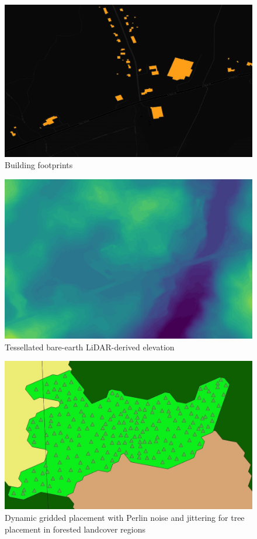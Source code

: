 \documentclass{article}
\begin{document}
\begin{figure}[H]
      \caption{Building footprints}
      \begin{center}
            \includegraphics[width=4.5in]{buildings.jpg}
      \end{center}
\end{figure}

\begin{figure}[H]
      \caption{Tessellated bare-earth LiDAR-derived elevation}
      \begin{center}
            \includegraphics[width=4.5in]{bare_earth.jpg}
      \end{center}
\end{figure}

\begin{figure}[H]
      \caption{Dynamic gridded placement with Perlin noise and jittering for tree placement in forested landcover regions}
      \begin{center}
            \includegraphics[width=4.5in]{tree_placement.jpg}
      \end{center}
\end{figure}
\end{document}
